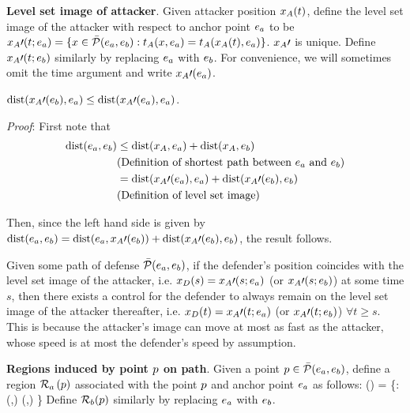 \begin{defn} %
\textbf{Level set image of attacker}. Given attacker position $x_A(t)$, define the level set image of the attacker with respect to anchor point $e_a$ to be $x_A\prime(t;e_a) = \{x\in\bar{\mathcal{P}}(e_a,e_b): t_A(x,e_a) = t_A(x_A(t),e_a)\}$. $x_A\prime$ is unique. Define $x_A\prime(t;e_b)$ similarly by replacing $e_a$ with $e_b$. For convenience, we will sometimes omit the time argument and write $x_A\prime(e_a)$.
\end{defn}

\begin{rem}
\label{rem:image_of_a}
$\text{dist}(x_A\prime(e_b),e_a) \le \text{dist}(x_A\prime(e_a),e_a)$. 

\textit{Proof}:
First note that
\begin{equation*}
\begin{aligned}
\text{dist}(e_a,e_b) &\le \text{dist}(x_A,e_a) + \text{dist}(x_A,e_b)\\
& \text{(Definition of shortest path between $e_a$ and $e_b$)} \\
& = \text{dist}(x_A\prime(e_a),e_a) + \text{dist}(x_A\prime(e_b),e_b) \\
& \text{(Definition of level set image)}
\end{aligned}
\end{equation*}

Then, since the left hand side is given by $\text{dist}(e_a,e_b) = \text{dist}(e_a,x_A\prime(e_b))+\text{dist}(x_A\prime(e_b),e_b)$, the result follows.
\end{rem}

\begin{rem}
Given some path of defense $\bar{\mathcal{P}}(e_a,e_b)$, if the defender's position coincides with the level set image of the attacker, i.e. $x_D(s) = x_A\prime(s;e_a)$ (or $x_A\prime(s;e_b)$) at some time $s$, then there exists a control for the defender to always remain on the level set image of the attacker thereafter, i.e. $x_D(t) = x_A\prime(t;e_a)$ (or $x_A\prime(t;e_b)$) $\forall t\ge s$. This is because the attacker's image can move at most as fast as the attacker, whose speed is at most the defender's speed by assumption.
\end{rem}

\begin{defn} %
\label{def:d_win_region}
\textbf{Regions induced by point $p$ on path}. Given a point $p\in\bar{\mathcal{P}}(e_a,e_b)$, define a region $\mathcal{R}_a\left(p\right)$ associated with the point $p$ and anchor point $e_a$ as follows:
\bq
\rpa\left(\ppath\right) = \left\{\x: \dist(\x,\apa) \leq \dist(\ppath,\apa) \right\}
\eq
Define $\mathcal{R}_b(p)$ similarly by replacing $e_a$ with $e_b$.
\end{defn}

